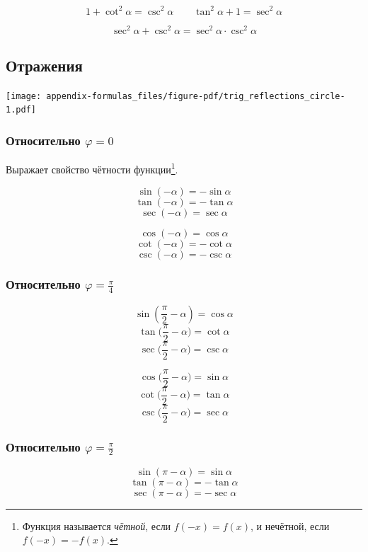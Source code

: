 \documentclass[
  letterpaper,
  DIV=11,
  numbers=noendperiod]{scrreprt}
\theoremstyle{definition}
\theoremstyle{remark}
\begin{document}
\[
1 + \cot^2 \alpha = \csc^2 \alpha \qquad
\tan^2 \alpha + 1 = \sec ^2 \alpha
\]

\[
\sec^2 \alpha + \csc^2 \alpha = \sec^2 \alpha \cdot \csc^2 \alpha
\]

\subsection{Отражения}\label{trig_reflections}

\texttt{[image: appendix-formulas\_files/figure-pdf/trig\_reflections\_circle-1.pdf]}

\subsubsection{\texorpdfstring{Относительно
\(\varphi = 0\)}{Относительно \textbackslash varphi = 0}}\label{trig_reflections_0}

Выражает свойство чётности функции\footnote{Функция называется
  \emph{чётной}, если \(f(-x) = f(x)\), и нечётной, если
  \(f(-x) = -f(x)\).}.

\[\sin (-\alpha) = -\sin \alpha\] \[\tan (-\alpha) = -\tan \alpha\]
\[\sec (-\alpha) = \sec \alpha\]

\[\cos (-\alpha) = \cos \alpha\] \[\cot (-\alpha) = -\cot \alpha\]
\[\csc (-\alpha) = -\csc \alpha\]

\subsubsection{\texorpdfstring{Относительно
\(\varphi = \frac{\pi}{4}\)}{Относительно \textbackslash varphi = \textbackslash frac\{\textbackslash pi\}\{4\}}}\label{trig_reflections_pi4}

\[\sin (\frac{\pi}{2}-\alpha) = \cos \alpha\]
\[\tan \Big(\frac{\pi}{2}-\alpha\Big) = \cot \alpha\]
\[\sec \Big(\frac{\pi}{2}-\alpha\Big) = \csc \alpha\]

\[\cos \Big(\frac{\pi}{2}-\alpha\Big) = \sin \alpha\]
\[\cot \Big(\frac{\pi}{2}-\alpha\Big) = \tan \alpha\]
\[\csc \Big(\frac{\pi}{2}-\alpha\Big) = \sec \alpha\]

\subsubsection{\texorpdfstring{Относительно
\(\varphi = \frac{\pi}{2}\)}{Относительно \textbackslash varphi = \textbackslash frac\{\textbackslash pi\}\{2\}}}\label{trig_reflections_pi2}

\[\sin (\pi-\alpha) = \sin \alpha\] \[\tan (\pi-\alpha) = -\tan \alpha\]
\[\sec (\pi-\alpha) = -\sec \alpha\]
\end{document}
